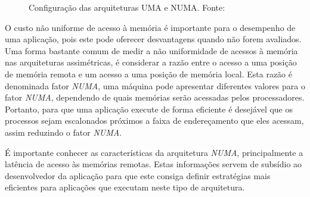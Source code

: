 \documentclass[ti]{texufpel}
\begin{document}
\begin{figure}[!htp]
\centering
{}
\caption{Configuração das arquiteturas UMA e NUMA. Fonte:~\cite{rodolfo14}}
\label{arquiteturas_config}
\end{figure}

O custo não uniforme de acesso à memória é importante para o desempenho de uma aplicação, pois este pode oferecer desvantagens quando não forem avaliados. Uma forma bastante comum de medir a não uniformidade de acessos à memória nas arquiteturas assimétricas, é considerar a razão entre o acesso a uma posição de memória remota e um acesso a uma posição de memória local. Esta razão é denominada fator \emph{NUMA}, uma máquina pode apresentar diferentes valores para o fator \emph{NUMA}, dependendo de quais memórias serão acessadas pelos processadores. Portanto, para que uma aplicação execute de forma eficiente é desejável que os processos sejam escalonados próximos a faixa de endereçamento que eles acessam, assim reduzindo o fator \emph{NUMA}.

É importante conhecer as características da arquitetura \emph{NUMA}, principalmente a latência de acesso às memórias remotas. Estas informações servem de subsídio ao desenvolvedor da aplicação para que este consiga definir estratégias mais eficientes para aplicações que executam neste tipo de arquitetura.
\end{document}
